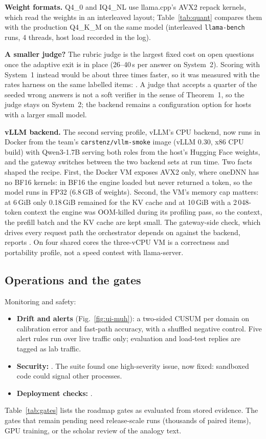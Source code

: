 \textbf{Weight formats.} Q4\_0 and IQ4\_NL use llama.cpp's AVX2 repack kernels, which read the weights in an
interleaved layout; Table~\ref{tab:quant} compares them with the production Q4\_K\_M on the same model
(interleaved \texttt{llama-bench} runs, 4 threads, host load recorded in the log).
\begin{table}[t]
\centering\caption{Weight formats, Qwen3-1.7B, llama-bench pp128/tg64}\label{tab:quant}
\QuantTable
\end{table}

\textbf{A smaller judge?} The rubric judge is the largest fixed cost on open questions once the adaptive exit
is in place (26--40\,s per answer on System~2). Scoring with System~1 instead would be about three times
faster, so it was measured with the rates harness on the same labelled items: \JudgeCompare. A judge that
accepts a quarter of the seeded wrong answers is not a soft verifier in the sense of Theorem~1, so the judge stays
on System~2; the backend remains a configuration option for hosts with a larger small model.

\textbf{vLLM backend.} The second serving profile, vLLM's CPU backend, now runs in Docker from the team's
\texttt{carstenz/vllm-smoke} image (vLLM 0.30, x86 CPU build) with Qwen3-1.7B serving both roles from the host's
Hugging Face weights, and the gateway switches between the two backend sets at run time. Two facts shaped the
recipe. First, the Docker VM exposes AVX2 only, where oneDNN has no BF16 kernels: in BF16 the engine loaded but
never returned a token, so the model runs in FP32 (6.8\,GB of weights). Second, the VM's memory cap matters: at
6\,GiB only 0.18\,GiB remained for the KV cache and at 10\,GiB with a 2\,048-token context the engine was OOM-killed
during its profiling pass, so the context, the prefill batch and the KV cache are kept small. The gateway-side
check, which drives every request path the orchestrator depends on against the backend, reports
\VllmCheckSummary. On four shared cores the three-vCPU VM is a correctness and portability profile, not a
speed contest with llama-server.

\subsection{Operations and the gates}
Monitoring and safety:
\begin{itemize}
\item \textbf{Drift and alerts} (Fig.~\ref{fig:ui-muh}): a two-sided CUSUM per domain on calibration error and
fast-path accuracy, with a shuffled negative control. Five alert rules run over live traffic only; evaluation
and load-test replies are tagged as lab traffic.
\item \textbf{Security:} \SecuritySummary. The suite found one high-severity issue, now fixed: sandboxed code
could signal other processes.
\item \textbf{Deployment checks:} \DeploySummary.
\end{itemize}
Table~\ref{tab:gates} lists the roadmap gates as evaluated from stored evidence. The gates that remain pending
need release-scale runs (thousands of paired items), GPU training, or the scholar review of the analogy text.

